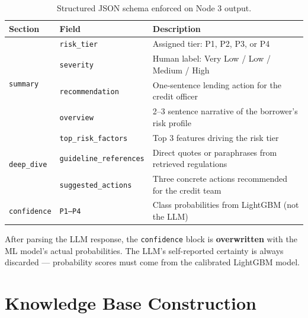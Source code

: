 \documentclass[11pt,a4paper]{article}
\begin{document}
\begin{table}[h!]
    \centering
    \small
    \renewcommand{\arraystretch}{1.45}
    \begin{tabularx}{\textwidth}{@{} l l X @{}}
        \toprule
        \textbf{Section} & \textbf{Field} & \textbf{Description} \\
        \midrule
        \multirow{4}{*}{\texttt{summary}}
            & \texttt{risk\_tier}     & Assigned tier: P1, P2, P3, or P4 \\
            & \texttt{severity}       & Human label: Very Low / Low / Medium / High \\
            & \texttt{recommendation} & One-sentence lending action for the credit officer \\
            & \texttt{overview}       & 2--3 sentence narrative of the borrower's risk profile \\
        \midrule
        \multirow{3}{*}{\texttt{deep\_dive}}
            & \texttt{top\_risk\_factors}    & Top 3 features driving the risk tier \\
            & \texttt{guideline\_references} & Direct quotes or paraphrases from retrieved regulations \\
            & \texttt{suggested\_actions}    & Three concrete actions recommended for the credit team \\
        \midrule
        \texttt{confidence}
            & \texttt{P1--P4} & Class probabilities from LightGBM (not the LLM) \\
        \bottomrule
    \end{tabularx}
    \caption{Structured JSON schema enforced on Node 3 output.}
    \label{tab:json_schema}
\end{table}

\vspace{4pt}
\begin{tcolorbox}[keybox, title={Design Decision: Probability Integrity}]
\small After parsing the LLM response, the \texttt{confidence} block is \textbf{overwritten} with the ML model's actual probabilities. The LLM's self-reported certainty is always discarded --- probability scores must come from the calibrated LightGBM model.
\end{tcolorbox}
\vspace{4pt}

\section{Knowledge Base Construction}
\end{document}
